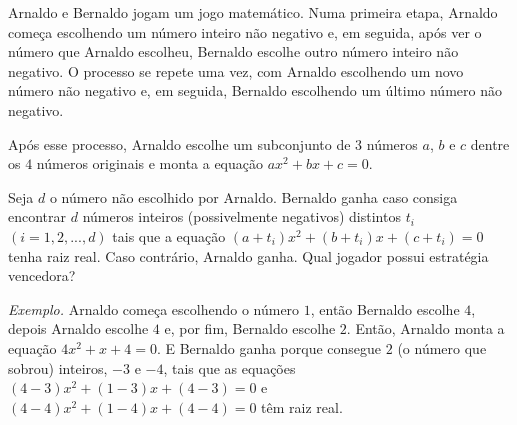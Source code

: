 Arnaldo e Bernaldo jogam um jogo matemático.
Numa primeira etapa, Arnaldo começa escolhendo um número inteiro não negativo e, em seguida, após ver o número que Arnaldo escolheu, Bernaldo escolhe outro número inteiro não negativo.
O processo se repete uma vez, com Arnaldo escolhendo um novo número não negativo e, em seguida, Bernaldo escolhendo um último número não negativo.

Após esse processo, Arnaldo escolhe um subconjunto de $3$ números $a$, $b$ e $c$ dentre os $4$ números originais e monta a equação $ax^2 + bx + c = 0$.

Seja $d$ o número não escolhido por Arnaldo. Bernaldo ganha caso consiga encontrar $d$ números inteiros (possivelmente negativos) distintos $t_i$ $(i = 1, 2, ..., d)$ tais que a equação $(a + t_i)x^2 + (b + t_i)x + (c + t_i) = 0$
tenha raiz real. Caso contrário, Arnaldo ganha. Qual jogador possui estratégia vencedora?


\noindent\textit{Exemplo.} Arnaldo começa escolhendo o número $1$, então Bernaldo escolhe $4$, depois Arnaldo escolhe $4$ e, por fim, Bernaldo escolhe $2$.
Então, Arnaldo monta a equação $4x^2 + x + 4 = 0$.
E Bernaldo ganha porque consegue $2$ (o número que sobrou) inteiros, $-3$ e $-4$, tais que as equações $(4 - 3)x^2 + (1 - 3)x + (4 - 3) = 0$ e $(4 - 4)x^2 + (1 - 4)x + (4 - 4) = 0$ têm raiz real.
